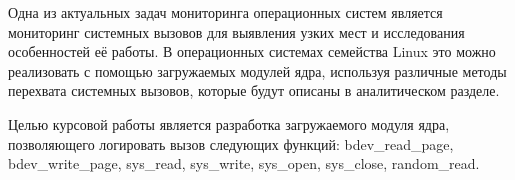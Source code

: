\Introduction
    Одна из актуальных задач мониторинга операционных систем является
    мониторинг системных вызовов для выявления узких мест и исследования особенностей её работы.
    В операционных системах семейства Linux
    это можно реализовать с помощью загружаемых модулей ядра,
    используя различные методы перехвата системных вызовов,
    которые будут описаны в аналитическом разделе.

    Целью курсовой работы является разработка загружаемого модуля ядра,
    позволяющего логировать вызов следующих функций: 
    bdev\_read\_page, 
    bdev\_write\_page, 
    sys\_read, sys\_write, 
    sys\_open, 
    sys\_close, 
    random\_read.

\pagebreak